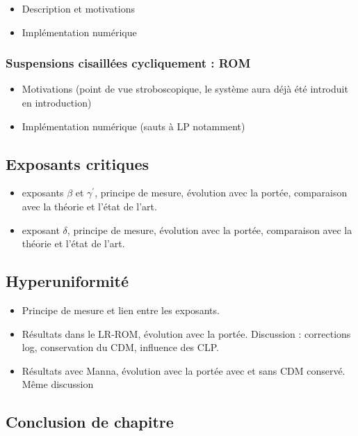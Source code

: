 \documentclass[10pt,a4paper]{article}
\begin{document}
\begin{itemize}
	\item Description et motivations
	\item Implémentation numérique
\end{itemize}

\subsubsection{Suspensions cisaillées cycliquement : ROM}

\begin{itemize}
	\item Motivations (point de vue stroboscopique, le système aura déjà été introduit en introduction)
	\item Implémentation numérique (sauts à LP notamment)
\end{itemize}

\subsection{Exposants critiques}

\begin{itemize}
	\item exposants $\beta$ et $\gamma^\prime$, principe de mesure, évolution avec la portée, comparaison avec la théorie et l'état de l'art.
	\item exposant $\delta$, principe de mesure, évolution avec la portée, comparaison avec la théorie et l'état de l'art.
\end{itemize}

\subsection{Hyperuniformité}

\begin{itemize}
	\item Principe de mesure et lien entre les exposants.
	\item Résultats dans le LR-ROM, évolution avec la portée. Discussion : corrections log, conservation du CDM, influence des CLP.
	\item Résultats avec Manna, évolution avec la portée avec et sans CDM conservé. Même discussion
\end{itemize}

\subsection{Conclusion de chapitre}
\end{document}
